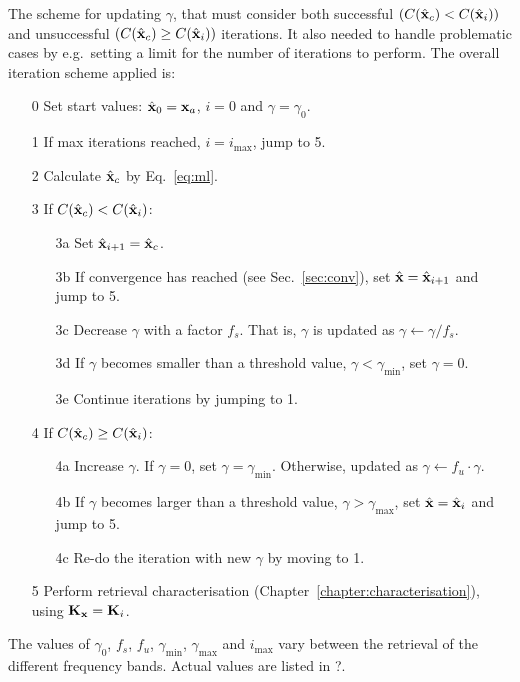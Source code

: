 The scheme for updating $\gamma$, that must consider both successful
$(C(\hat{\mathbf{x}}_c) < C(\hat{\mathbf{x}}_i))$ and
unsuccessful $(C(\hat{\mathbf{x}}_c) \geq C(\hat{\mathbf{x}}_i))$ iterations. It also
needed to handle problematic cases by e.g.\ setting a limit for the number of
iterations to perform. The overall iteration scheme applied is:
\begin{itemize}
\item[0] Set start values: $\hat{\mathbf{x}}_0 = \mathbf{x}_{a}$, $i=0$ and $\gamma=\gamma_0$.
\item[1] If max iterations reached, $i=i_\mathrm{max}$, jump to 5. 
\item[2] Calculate $\hat{\mathbf{x}}_c$ by Eq.~\ref{eq:ml}.
\item[3] If $C(\hat{\mathbf{x}}_c) < C(\hat{\mathbf{x}}_i)$:
  \begin{itemize}
  \item[3a] Set $\hat{\mathbf{x}}_{i+1}=\hat{\mathbf{x}}_c$.
  \item[3b] If convergence has reached (see Sec.~\ref{sec:conv}), set
    $\hat{\mathbf{x}}=\hat{\mathbf{x}}_{i+1}$ and jump to 5.
  \item[3c] Decrease $\gamma$ with a factor $f_s$. That is, $\gamma$ is updated
    as $\gamma\leftarrow\gamma/f_s$. 
  \item[3d] If $\gamma$ becomes smaller than a 
    threshold value, $\gamma<\gamma_\mathrm{min}$, set $\gamma=0$.
  \item[3e] Continue iterations by jumping to 1.
  \end{itemize}
\item[4] If $C(\hat{\mathbf{x}}_c) \geq C(\hat{\mathbf{x}}_i)$:
  \begin{itemize}
  \item[4a] Increase $\gamma$. If $\gamma=0$, set $\gamma=\gamma_\mathrm{min}$.
    Otherwise, updated as $\gamma\leftarrow f_u\cdot\gamma$.
  \item[4b] If $\gamma$ becomes larger than a threshold value,
    $\gamma>\gamma_\mathrm{max}$, set $\hat{\mathbf{x}}=\hat{\mathbf{x}}_i$ and jump to 5.
  \item[4c] Re-do the iteration with new $\gamma$ by moving to 1.
  \end{itemize}
\item[5] Perform retrieval characterisation
  (Chapter~\ref{chapter:characterisation}), using $\mathbf{K}_{\mathbf{x}}=\mathbf{K}_{i}$.
\end{itemize}
The values of $\gamma_0$, $f_s$, $f_u$, $\gamma_\mathrm{min}$,
$\gamma_\mathrm{max}$ and $i_\mathrm{max}$ vary between the retrieval of the
different frequency bands. Actual values are listed in ?.
\\


